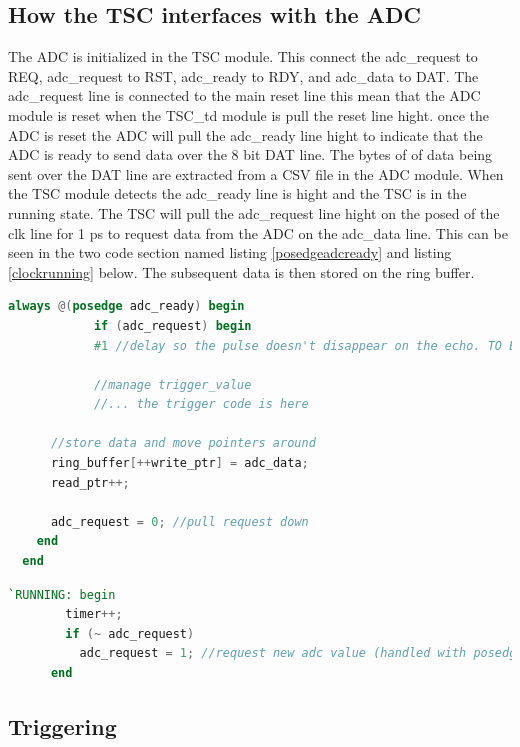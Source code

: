\subsection{How the TSC interfaces with the ADC}
The ADC is initialized in the TSC module.
This connect the adc\_request to REQ, adc\_request to RST,  adc\_ready to RDY, and adc\_data to DAT.
The adc\_request line is connected to the main reset line this mean that the ADC module is reset when the TSC\_td
module is pull the reset line hight.
once the ADC is reset the ADC will pull the adc\_ready line hight to indicate that the ADC is ready to send data over the 8 bit DAT line.
The  bytes of of data being sent over the DAT line are extracted from a CSV file in the ADC module.
When the TSC module detects the adc\_ready line is hight and the TSC is in the running state.
The TSC will pull the adc\_request line hight on the posed of the clk line for 1 ps to request data from the ADC on the adc\_data line.
This can be seen in the two code section named listing \ref{posedgeadcready} and listing \ref{clockrunning} below.
The subsequent data is then stored on the ring buffer.


\begin{lstlisting}[language=Verilog, caption={Code for storing data and moving pointers in the posedge adc\_ready}, label={posedgeadcready}]
      always @(posedge adc_ready) begin
            if (adc_request) begin
            #1 //delay so the pulse doesn't disappear on the echo. TO BE REMOVED
          
            //manage trigger_value
            //... the trigger code is here

      //store data and move pointers around
      ring_buffer[++write_ptr] = adc_data;
      read_ptr++;

      adc_request = 0; //pull request down
    end
  end
\end{lstlisting}


\begin{lstlisting}[language=Verilog, caption={Code for requesting data from the ADC on posedge of the clock when in RUNNING state}, label={clockrunning}]
      `RUNNING: begin
        timer++;
        if (~ adc_request)
          adc_request = 1; //request new adc value (handled with posedge adc_ready)
      end
\end{lstlisting}




\subsection{Triggering}

